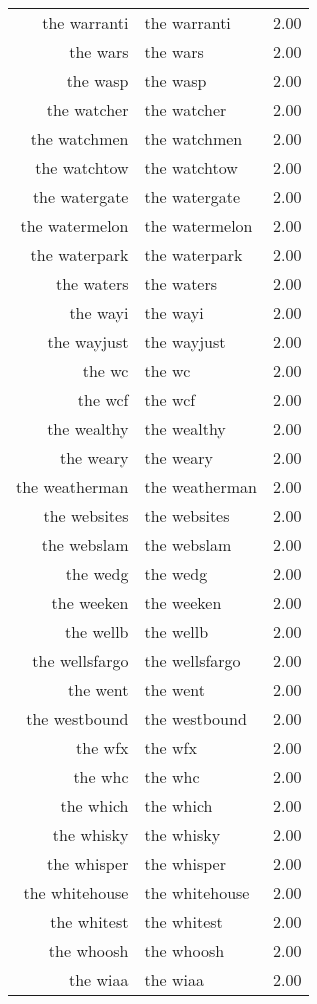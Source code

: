 \begin{table}[ht]
\begin{tabular}{rlr}
  the warranti & the warranti & 2.00 \\ 
  the wars & the wars & 2.00 \\ 
  the wasp & the wasp & 2.00 \\ 
  the watcher & the watcher & 2.00 \\ 
  the watchmen & the watchmen & 2.00 \\ 
  the watchtow & the watchtow & 2.00 \\ 
  the watergate & the watergate & 2.00 \\ 
  the watermelon & the watermelon & 2.00 \\ 
  the waterpark & the waterpark & 2.00 \\ 
  the waters & the waters & 2.00 \\ 
  the wayi & the wayi & 2.00 \\ 
  the wayjust & the wayjust & 2.00 \\ 
  the wc & the wc & 2.00 \\ 
  the wcf & the wcf & 2.00 \\ 
  the wealthy & the wealthy & 2.00 \\ 
  the weary & the weary & 2.00 \\ 
  the weatherman & the weatherman & 2.00 \\ 
  the websites & the websites & 2.00 \\ 
  the webslam & the webslam & 2.00 \\ 
  the wedg & the wedg & 2.00 \\ 
  the weeken & the weeken & 2.00 \\ 
  the wellb & the wellb & 2.00 \\ 
  the wellsfargo & the wellsfargo & 2.00 \\ 
  the went & the went & 2.00 \\ 
  the westbound & the westbound & 2.00 \\ 
  the wfx & the wfx & 2.00 \\ 
  the whc & the whc & 2.00 \\ 
  the which & the which & 2.00 \\ 
  the whisky & the whisky & 2.00 \\ 
  the whisper & the whisper & 2.00 \\ 
  the whitehouse & the whitehouse & 2.00 \\ 
  the whitest & the whitest & 2.00 \\ 
  the whoosh & the whoosh & 2.00 \\ 
  the wiaa & the wiaa & 2.00 \\ 

\end{tabular}
\end{table}

